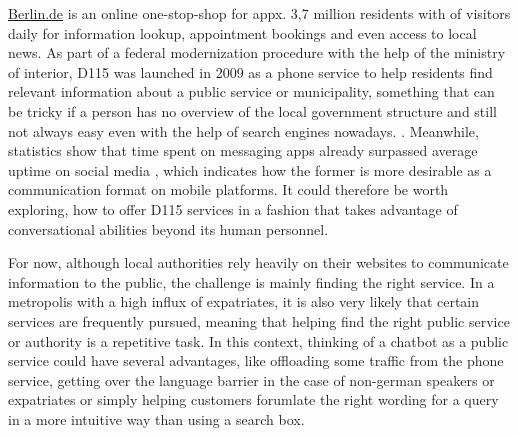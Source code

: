 \href{https://www.berlin.de}{Berlin.de} is an online one-stop-shop for appx. 3,7 million residents \cite{zensus} with  of visitors daily for information lookup, appointment bookings and even access to local news. As part of a federal modernization procedure with the help of the ministry of interior, D115 was launched in 2009 \cite{d115} as a phone service to help residents find relevant information about a public service or municipality, something that can be tricky if a person has no overview of the local government structure and still not always easy even with the help of search engines nowadays.
.
Meanwhile, statistics \cite{businsider} show that time spent on messaging apps already surpassed average uptime on social media , which indicates how the former is more desirable as a communication format on mobile platforms. It could therefore be worth exploring, how to offer D115 services in a fashion that takes advantage of conversational abilities beyond its human personnel. 

For now, although local authorities rely heavily on their websites to communicate information to the public, the challenge is mainly finding the right service. In a metropolis with a high influx of expatriates, it is also very likely that certain services are frequently pursued, meaning that helping find the right public service or authority is a repetitive task. In this context, thinking of a chatbot as a public service could have several advantages, like offloading some traffic from the phone service, getting over the language barrier in the case of non-german speakers or expatriates or simply helping customers forumlate the right wording for a query in a more intuitive way than using a search box. 









